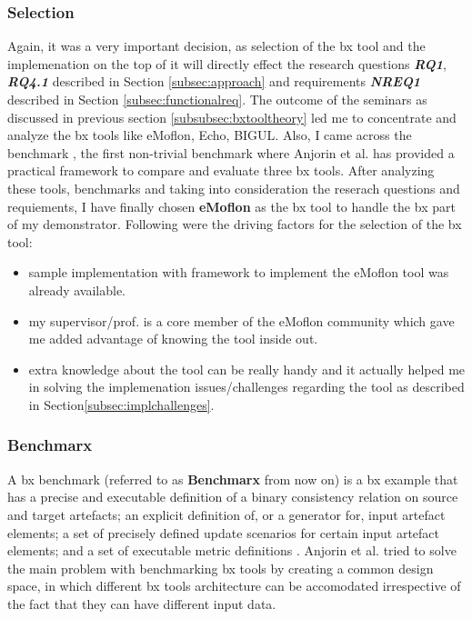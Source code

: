 \subsubsection{Selection}\label{subsubsec:bxtoolselection}
Again, it was a very important decision, as selection of the bx tool and the implemenation on the top of it will directly effect the research questions \textbf{\textit{RQ1}}, \textbf{\textit{RQ4.1}} described in Section \ref{subsec:approach} and requirements \textbf{\textit{NREQ1}} described in Section \ref{subsec:functionalreq}.
\newline\newline The outcome of the seminars as discussed in previous section \ref{subsubsec:bxtooltheory} led me to concentrate and analyze the bx tools like eMoflon, Echo, BIGUL. Also, I came across the benchmark \cite{benchmarx} \cite{benchmarx-reload}, the first non-trivial benchmark where Anjorin et al. has provided a practical framework to compare and evaluate three bx tools. After analyzing these tools, benchmarks and taking into consideration the reserach questions and requiements, I have finally chosen \textbf{eMoflon} as the bx tool to handle the bx part of my demonstrator. Following were the driving factors for the selection of the bx tool:
\begin{itemize}
	\item {sample implementation with framework to implement the eMoflon tool was already available.}
	\item {my supervisor/prof. is a core member of the eMoflon community which gave me added advantage of knowing the tool inside out.}
	\item {extra knowledge about the tool can be really handy and it actually helped me in solving the implemenation issues/challenges regarding the tool as described in Section\ref{subsec:implchallenges}.}
\end{itemize}

\subsubsection{Benchmarx}\label{subsubsec:benchmarx}
A bx benchmark (referred to as \textbf{Benchmarx} from now on) is a bx example that has a precise and executable definition of a binary consistency relation on source and target artefacts; an explicit definition of, or a generator for, input artefact elements; a set of precisely defined update scenarios for certain input artefact elements; and a set of executable metric definitions \cite{bx-theoryandappl}.
\newline\newline Anjorin et al. \cite{benchmarx-reload} tried to solve the main problem with benchmarking bx tools by creating a common design space, in which different bx tools architecture can be accomodated irrespective of the fact that they can have different input data. 
